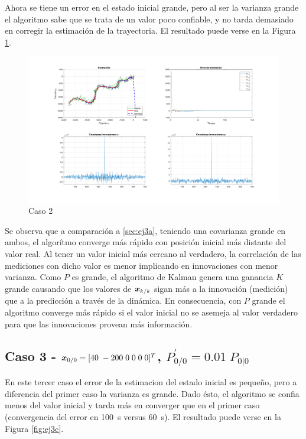 	Ahora se tiene un error en el estado inicial grande, pero al ser la varianza grande el algoritmo sabe que se trata de un valor poco confiable, y no tarda demasiado en corregir la estimación de la trayectoria. El resultado puede verse en la Figura \ref{fig:ej3b}.
		
		\begin{figure}[H]
			\centering
			\includegraphics[scale=0.5,trim={6,5cm 0 0 0}]{Figuras/graf_ej3b.pdf}
			\caption{Caso 2}
			\label{fig:ej3b}
		\end{figure}
	\indent Se observa que a comparación a \ref{sec:ej3a}, teniendo una covarianza grande en ambos, el algorítmo converge más rápido con posición inicial más distante del valor real. Al tener un valor inicial más cercano al verdadero, la correlación de las mediciones con dicho valor es menor implicando en innovaciones con menor varianza. Como $P$ es grande, el algoritmo de Kalman genera una ganancia $K$ grande causando que los valores de $\boldsymbol{x}_{k/k}$ sigan más a la innovación (medición) que a la predicción a través de la dinámica. En consecuencia, con $P$ grande el algoritmo converge más rápido si el valor inicial no se asemeja al valor verdadero para que las innovaciones provean más información.
	
	\subsection{Caso 3 - $\boldsymbol{x}_{0/0} = [40\;-200\;0\;0\;0\;0]^T$, $P^{'}_{0/0}=\num{0.01}\; P_{0|0}$} \label{sec:ej3c}
	
	En este tercer caso el error de la estimacion del estado inicial es pequeño, pero a diferencia del primer caso la varianza es grande. Dado ésto, el algoritmo se confia menos del valor inicial y tarda más en converger que en el primer caso (convergencia del error en \SI{100}{\s} versus \SI{60}{\s}). El resultado puede verse en la Figura \ref{fig:ej3c}.
	
